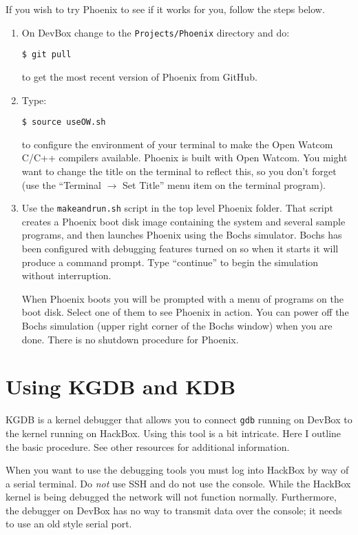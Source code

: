 \documentclass{article}
\newcommand{\command}[1]{\texttt{#1}}
\newcommand{\filename}[1]{\texttt{#1}}
\begin{document}
If you wish to try Phoenix to see if it works for you, follow the steps below.

\begin{enumerate}

\item On DevBox change to the \texttt{Projects/Phoenix} directory and do:
\begin{Verbatim}
$ git pull
\end{Verbatim}
  to get the most recent version of Phoenix from GitHub.

\item Type:
\begin{Verbatim}
$ source useOW.sh
\end{Verbatim}
  to configure the environment of your terminal to make the Open Watcom C/C++ compilers
  available. Phoenix is built with Open Watcom. You might want to change the title on the
  terminal to reflect this, so you don't forget (use the ``Terminal $\rightarrow$ Set Title''
  menu item on the terminal program).

\item Use the \filename{makeandrun.sh} script in the top level Phoenix folder. That script
  creates a Phoenix boot disk image containing the system and several sample programs, and then
  launches Phoenix using the Bochs simulator. Bochs has been configured with debugging features
  turned on so when it starts it will produce a command prompt. Type ``continue'' to begin the
  simulation without interruption.

  When Phoenix boots you will be prompted with a menu of programs on the boot disk. Select one
  of them to see Phoenix in action. You can power off the Bochs simulation (upper right corner
  of the Bochs window) when you are done. There is no shutdown procedure for Phoenix.

\end{enumerate}

\section{Using KGDB and KDB}

KGDB is a kernel debugger that allows you to connect \command{gdb} running on DevBox to the
kernel running on HackBox. Using this tool is a bit intricate. Here I outline the basic
procedure. See other resources for additional information.

When you want to use the debugging tools you must log into HackBox by way of a serial terminal.
Do \emph{not} use SSH and do not use the console. While the HackBox kernel is being debugged the
network will not function normally. Furthermore, the debugger on DevBox has no way to transmit
data over the console; it needs to use an old style serial port.
\end{document}
